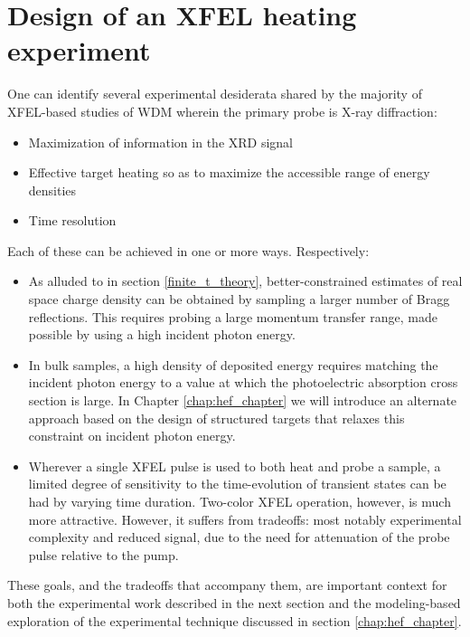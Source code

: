 \documentclass [11pt, proquest, article] {uwthesis}[2016/11/22]
\begin{document}
\section{Design of an XFEL heating experiment}
One can identify several experimental desiderata shared by the majority of XFEL-based studies of WDM wherein the primary probe is X-ray diffraction:

\begin{itemize}
\item{Maximization of information in the XRD signal}
\item{Effective target heating so as to maximize the accessible range of energy densities}
\item{Time resolution}
\end{itemize}

Each of these can be achieved in one or more ways. Respectively:

\begin{itemize}
\item{As alluded to in section \ref{finite_t_theory}, better-constrained estimates of real space charge density can be obtained by sampling a larger number of Bragg reflections. This requires probing a large momentum transfer range, made possible by using a high incident photon energy.}
\item{In bulk samples, a high density of deposited energy requires matching the incident photon energy to a value at which the photoelectric absorption cross section is large. In Chapter \ref{chap:hef_chapter} we will introduce an alternate approach based on the design of structured targets that relaxes this constraint on incident photon energy.}
\item{Wherever a single XFEL pulse is used to both heat and probe a sample, a limited degree of sensitivity to the time-evolution of transient states can be had by varying time duration. Two-color XFEL operation, however, is much more attractive. However, it suffers from tradeoffs: most notably experimental complexity and reduced signal, due to the need for attenuation of the probe pulse relative to the pump. }
\end{itemize}
These goals, and the tradeoffs that accompany them, are important context for both the experimental work described in the next section and the modeling-based exploration of the experimental technique discussed in section \ref{chap:hef_chapter}.
\end{document}
